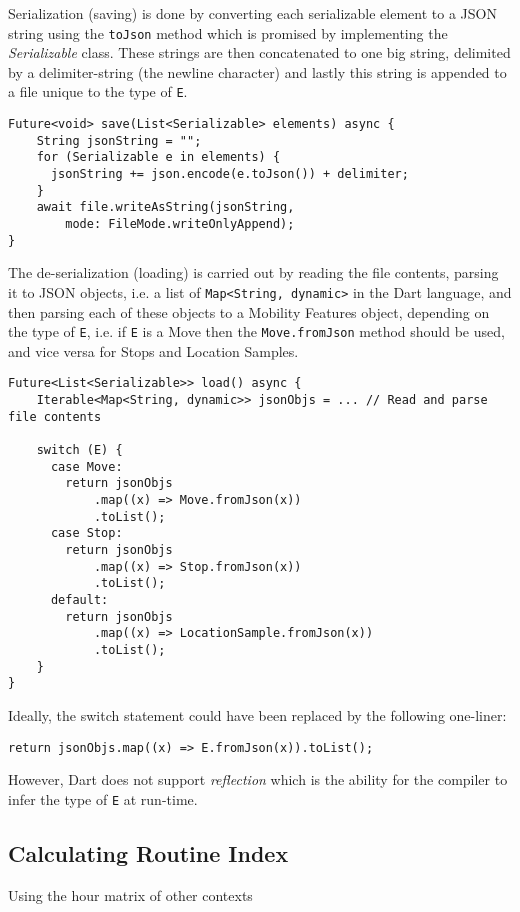 Serialization (saving) is done by converting each serializable element to a JSON string using the \verb|toJson| method which is promised by implementing the \textit{Serializable} class. These strings are then concatenated to one big string, delimited by a delimiter-string (the newline character) and lastly this string is appended to a file unique to the type of \verb|E|.

\begin{verbatim}
Future<void> save(List<Serializable> elements) async {
    String jsonString = "";
    for (Serializable e in elements) {
      jsonString += json.encode(e.toJson()) + delimiter;
    }
    await file.writeAsString(jsonString, 
        mode: FileMode.writeOnlyAppend);
}
\end{verbatim}

The de-serialization (loading) is carried out by reading the file contents, parsing it to JSON objects, i.e. a list of \verb|Map<String, dynamic>| in the Dart language, and then parsing each of these objects to a Mobility Features object, depending on the type of \verb|E|, i.e. if \verb|E| is a Move then the \verb|Move.fromJson| method should be used, and vice versa for Stops and Location Samples. 

\begin{verbatim}
Future<List<Serializable>> load() async {
    Iterable<Map<String, dynamic>> jsonObjs = ... // Read and parse file contents
    
    switch (E) {
      case Move:
        return jsonObjs
            .map((x) => Move.fromJson(x))
            .toList();
      case Stop:
        return jsonObjs
            .map((x) => Stop.fromJson(x))
            .toList();
      default:
        return jsonObjs
            .map((x) => LocationSample.fromJson(x))
            .toList();
    }
}
\end{verbatim}

Ideally, the switch statement could have been replaced by the following one-liner:
\begin{verbatim}
return jsonObjs.map((x) => E.fromJson(x)).toList();
\end{verbatim}

However, Dart does not support \textit{reflection} which is the ability for the compiler to infer the type of \verb|E| at run-time.

\subsection{Calculating Routine Index}
Using the hour matrix of other contexts